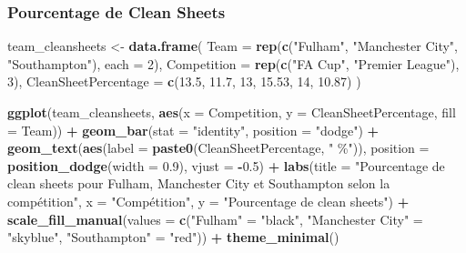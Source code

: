 \documentclass[
]{article}
\newenvironment{Shaded}{\begin{snugshade}}{\end{snugshade}}
\newcommand{\AttributeTok}[1]{\textcolor[rgb]{0.13,0.29,0.53}{#1}}
\newcommand{\DecValTok}[1]{\textcolor[rgb]{0.00,0.00,0.81}{#1}}
\newcommand{\FloatTok}[1]{\textcolor[rgb]{0.00,0.00,0.81}{#1}}
\newcommand{\FunctionTok}[1]{\textcolor[rgb]{0.13,0.29,0.53}{\textbf{#1}}}
\newcommand{\NormalTok}[1]{#1}
\newcommand{\OtherTok}[1]{\textcolor[rgb]{0.56,0.35,0.01}{#1}}
\newcommand{\SpecialCharTok}[1]{\textcolor[rgb]{0.81,0.36,0.00}{\textbf{#1}}}
\newcommand{\StringTok}[1]{\textcolor[rgb]{0.31,0.60,0.02}{#1}}
\begin{document}
\subsubsection{Pourcentage de Clean
Sheets}\label{pourcentage-de-clean-sheets-1}

\begin{Shaded}
\begin{Highlighting}[]
\NormalTok{team\_cleansheets }\OtherTok{\textless{}{-}} \FunctionTok{data.frame}\NormalTok{(}
  \AttributeTok{Team =} \FunctionTok{rep}\NormalTok{(}\FunctionTok{c}\NormalTok{(}\StringTok{"Fulham"}\NormalTok{, }\StringTok{"Manchester City"}\NormalTok{, }\StringTok{"Southampton"}\NormalTok{), }\AttributeTok{each =} \DecValTok{2}\NormalTok{),}
  \AttributeTok{Competition =} \FunctionTok{rep}\NormalTok{(}\FunctionTok{c}\NormalTok{(}\StringTok{"FA Cup"}\NormalTok{, }\StringTok{"Premier League"}\NormalTok{), }\DecValTok{3}\NormalTok{),}
  \AttributeTok{CleanSheetPercentage =} \FunctionTok{c}\NormalTok{(}\FloatTok{13.5}\NormalTok{, }\FloatTok{11.7}\NormalTok{, }\DecValTok{13}\NormalTok{, }\FloatTok{15.53}\NormalTok{, }\DecValTok{14}\NormalTok{, }\FloatTok{10.87}\NormalTok{)}
\NormalTok{)}

\FunctionTok{ggplot}\NormalTok{(team\_cleansheets, }\FunctionTok{aes}\NormalTok{(}\AttributeTok{x =}\NormalTok{ Competition, }\AttributeTok{y =}\NormalTok{ CleanSheetPercentage, }\AttributeTok{fill =}\NormalTok{ Team)) }\SpecialCharTok{+}
  \FunctionTok{geom\_bar}\NormalTok{(}\AttributeTok{stat =} \StringTok{"identity"}\NormalTok{, }\AttributeTok{position =} \StringTok{"dodge"}\NormalTok{) }\SpecialCharTok{+}
  \FunctionTok{geom\_text}\NormalTok{(}\FunctionTok{aes}\NormalTok{(}\AttributeTok{label =} \FunctionTok{paste0}\NormalTok{(CleanSheetPercentage, }\StringTok{" \%"}\NormalTok{)), }\AttributeTok{position =} \FunctionTok{position\_dodge}\NormalTok{(}\AttributeTok{width =} \FloatTok{0.9}\NormalTok{), }\AttributeTok{vjust =} \SpecialCharTok{{-}}\FloatTok{0.5}\NormalTok{) }\SpecialCharTok{+}
  \FunctionTok{labs}\NormalTok{(}\AttributeTok{title =} \StringTok{"Pourcentage de clean sheets pour Fulham, Manchester City et Southampton selon la compétition"}\NormalTok{,}
       \AttributeTok{x =} \StringTok{"Compétition"}\NormalTok{, }\AttributeTok{y =} \StringTok{"Pourcentage de clean sheets"}\NormalTok{) }\SpecialCharTok{+}
  \FunctionTok{scale\_fill\_manual}\NormalTok{(}\AttributeTok{values =} \FunctionTok{c}\NormalTok{(}\StringTok{"Fulham"} \OtherTok{=} \StringTok{"black"}\NormalTok{, }\StringTok{"Manchester City"} \OtherTok{=} \StringTok{"skyblue"}\NormalTok{, }\StringTok{"Southampton"} \OtherTok{=} \StringTok{"red"}\NormalTok{)) }\SpecialCharTok{+}
  \FunctionTok{theme\_minimal}\NormalTok{()}
\end{Highlighting}
\end{Shaded}
\end{document}
